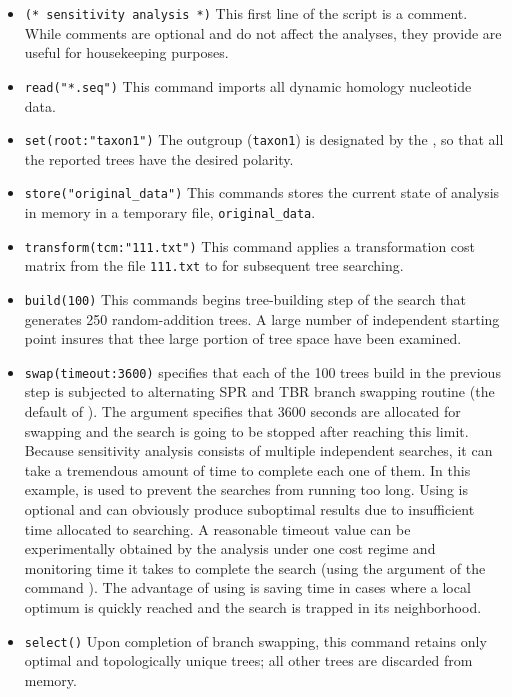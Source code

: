 \begin{itemize}
\item \texttt{(* sensitivity analysis *)} This first line of the script is a comment. While comments are optional and do not affect the analyses, they provide are useful for housekeeping purposes.
\item \texttt{read("*.seq")} This command imports all dynamic homology nucleotide data.
\item \texttt{set(root:"taxon1")} The outgroup (\texttt{taxon1}) is designated by the , so that all the reported trees have the desired polarity.
\item \texttt{store("original\_data")} This commands stores the current state of analysis in memory in a temporary file, \texttt{original\_data}.
\item \texttt{transform(tcm:"111.txt")} This command applies a transformation cost matrix from the file \texttt{111.txt} to for subsequent tree searching.
\item \texttt{build(100)} This commands begins tree-building step of the search that generates 250 random-addition trees. A large number of independent starting point insures that thee large portion of tree space have been examined.
\item \texttt{swap(timeout:3600)}  specifies that each of the 100 trees build in the previous step is subjected to alternating SPR and TBR branch swapping routine (the default of \poy). The argument  specifies that 3600 seconds are allocated for swapping and the search is going to be stopped after reaching this limit. Because sensitivity analysis consists of multiple independent searches, it can take a tremendous amount of time to complete each one of them. In this example,  is used to prevent the searches from running too long. Using  is optional and can obviously produce suboptimal results due to insufficient time allocated to searching. A reasonable timeout value can be experimentally obtained by the analysis under one cost regime and monitoring time it takes to complete the search (using the argument  of the command ). The advantage of using  is saving time in cases where a local optimum is quickly reached and the search is trapped in its neighborhood.
\item \texttt{select()} Upon completion of branch swapping, this command retains only optimal and topologically unique trees; all other trees are discarded from memory.

\end{itemize}
